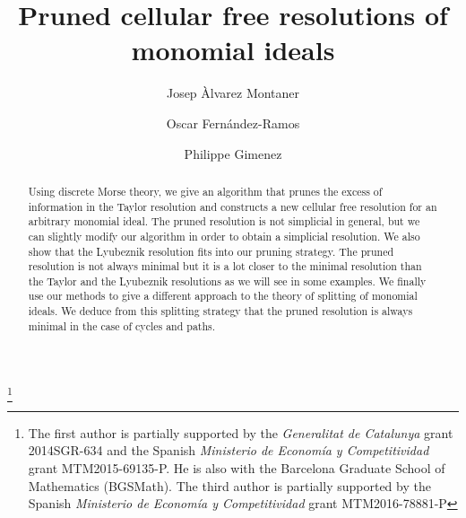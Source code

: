 \documentclass[12pt]{amsart}
\theoremstyle{definition}
\theoremstyle{remark}
\numberwithin{equation}{section}
\begin{document}
\title[Pruned cellular free resolutions of monomial ideals ]{Pruned cellular free resolutions of monomial ideals}

\author[J. \`Alvarez Montaner]{Josep \`Alvarez Montaner}

\address{Departament de Matem\`atiques\\
Universitat Polit\`ecnica de Catalunya, SPAIN} 


\author[O. Fern\'andez-Ramos]{Oscar Fern\'andez-Ramos}

\author[P. Gimenez]{Philippe Gimenez}
\address{Departamento  de \'Algebra,An\'alisis Matem\'atico,  Geometr\'ia y Topolog\'ia \&
Instituto de Investigaci\'on en Matem\'aticas de Valladolid (IMUVA),
Universidad de Valladolid, SPAIN}  

\thanks{The first author is partially supported by the {\it Generalitat de Catalunya} grant 2014SGR-634 and 
the Spanish {\it Ministerio de Econom\'ia y Competitividad} grant MTM2015-69135-P. He 
is also with the Barcelona Graduate School of Mathematics
(BGSMath).
The third author is partially supported by the Spanish
{\it Ministerio de Econom\'ia y Competitividad} grant
MTM2016-78881-P}





\begin{abstract}
Using discrete Morse theory, we give an algorithm that prunes the excess of information
in the Taylor resolution and constructs a new cellular free resolution for an arbitrary monomial ideal.
The pruned resolution is not simplicial in general, but we can slightly modify our algorithm in order to obtain
a simplicial resolution. We also show that the Lyubeznik resolution fits into our
pruning strategy.
The pruned resolution is not always minimal but it is a lot closer to the minimal resolution 
than the Taylor and the Lyubeznik resolutions as we will
see in some examples.
We finally use our methods to give a different approach to the theory of splitting of monomial ideals.
We deduce from this splitting strategy that the pruned resolution is always minimal in the case
of cycles and paths.

%
\end{abstract}
\end{document}
